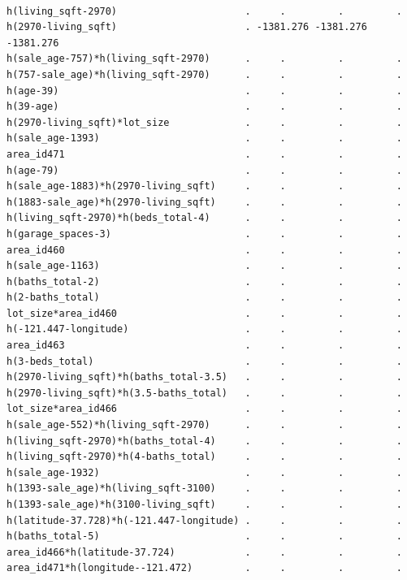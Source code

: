 \documentclass[
]{article}
\begin{document}
\begin{verbatim}
                                                                        
h(living_sqft-2970)                      .     .         .         .    
h(2970-living_sqft)                      . -1381.276 -1381.276 -1381.276
h(sale_age-757)*h(living_sqft-2970)      .     .         .         .    
h(757-sale_age)*h(living_sqft-2970)      .     .         .         .    
h(age-39)                                .     .         .         .    
h(39-age)                                .     .         .         .    
h(2970-living_sqft)*lot_size             .     .         .         .    
h(sale_age-1393)                         .     .         .         .    
area_id471                               .     .         .         .    
h(age-79)                                .     .         .         .    
h(sale_age-1883)*h(2970-living_sqft)     .     .         .         .    
h(1883-sale_age)*h(2970-living_sqft)     .     .         .         .    
h(living_sqft-2970)*h(beds_total-4)      .     .         .         .    
h(garage_spaces-3)                       .     .         .         .    
area_id460                               .     .         .         .    
h(sale_age-1163)                         .     .         .         .    
h(baths_total-2)                         .     .         .         .    
h(2-baths_total)                         .     .         .         .    
lot_size*area_id460                      .     .         .         .    
h(-121.447-longitude)                    .     .         .         .    
area_id463                               .     .         .         .    
h(3-beds_total)                          .     .         .         .    
h(2970-living_sqft)*h(baths_total-3.5)   .     .         .         .    
h(2970-living_sqft)*h(3.5-baths_total)   .     .         .         .    
lot_size*area_id466                      .     .         .         .    
h(sale_age-552)*h(living_sqft-2970)      .     .         .         .    
h(living_sqft-2970)*h(baths_total-4)     .     .         .         .    
h(living_sqft-2970)*h(4-baths_total)     .     .         .         .    
h(sale_age-1932)                         .     .         .         .    
h(1393-sale_age)*h(living_sqft-3100)     .     .         .         .    
h(1393-sale_age)*h(3100-living_sqft)     .     .         .         .    
h(latitude-37.728)*h(-121.447-longitude) .     .         .         .    
h(baths_total-5)                         .     .         .         .    
area_id466*h(latitude-37.724)            .     .         .         .    
area_id471*h(longitude--121.472)         .     .         .         .    
                                                                         

\end{verbatim}
\end{document}

